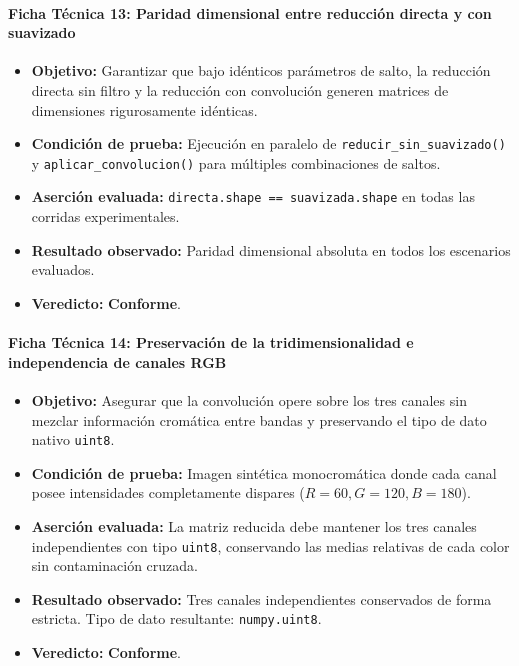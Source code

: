 \documentclass[11pt]{article}
\newcommand{\pruebaok}{\textcolor{verdeExito}{\textbf{Conforme}}}
\begin{document}
\paragraph{Ficha Técnica 13: Paridad dimensional entre reducción directa y con suavizado}
\begin{itemize}[itemsep=0.15em]
\item \textbf{Objetivo:} Garantizar que bajo idénticos parámetros de salto, la reducción directa sin filtro y la reducción con convolución generen matrices de dimensiones rigurosamente idénticas.
\item \textbf{Condición de prueba:} Ejecución en paralelo de \texttt{reducir\_sin\_suavizado()} y \texttt{aplicar\_convolucion()} para múltiples combinaciones de saltos.
\item \textbf{Aserción evaluada:} \texttt{directa.shape == suavizada.shape} en todas las corridas experimentales.
\item \textbf{Resultado observado:} Paridad dimensional absoluta en todos los escenarios evaluados.
\item \textbf{Veredicto:} \pruebaok.
\end{itemize}

\paragraph{Ficha Técnica 14: Preservación de la tridimensionalidad e independencia de canales RGB}
\begin{itemize}[itemsep=0.15em]
\item \textbf{Objetivo:} Asegurar que la convolución opere sobre los tres canales sin mezclar información cromática entre bandas y preservando el tipo de dato nativo \texttt{uint8}.
\item \textbf{Condición de prueba:} Imagen sintética monocromática donde cada canal posee intensidades completamente dispares ($R=60, G=120, B=180$).
\item \textbf{Aserción evaluada:} La matriz reducida debe mantener los tres canales independientes con tipo \texttt{uint8}, conservando las medias relativas de cada color sin contaminación cruzada.
\item \textbf{Resultado observado:} Tres canales independientes conservados de forma estricta. Tipo de dato resultante: \texttt{numpy.uint8}.
\item \textbf{Veredicto:} \pruebaok.
\end{itemize}
\end{document}
